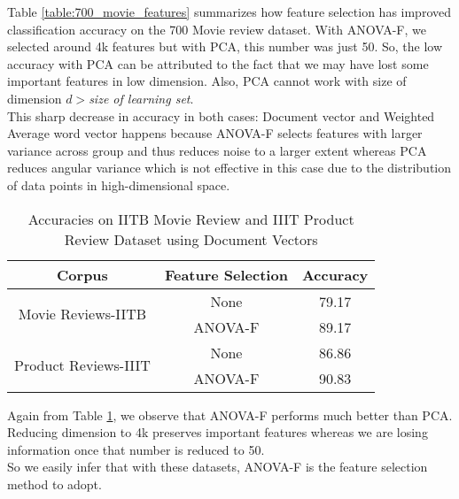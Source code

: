 Table \ref{table:700_movie_features} summarizes how feature selection has improved classification accuracy on the 700 Movie review dataset. With ANOVA-F, we selected around 4k features but with PCA, this number was just 50. So, the low accuracy with PCA can be attributed to the fact that we may have lost some important features in low dimension. Also, PCA cannot work with size of dimension $d>$\emph{size of learning set}.\\
This sharp decrease in accuracy in both cases: Document vector and Weighted Average word vector happens because ANOVA-F selects features with larger variance across group and thus reduces noise to a larger extent whereas PCA reduces angular variance which is not effective in this case due to the distribution of data points in high-dimensional space.

\begin{table}[h!]
\centering
\begin{tabular}{|c|c|c|}
\hline
\textbf{Corpus} & \textbf{Feature Selection} & \textbf{Accuracy} \\ \hline
\multirow{2}{*}{Movie Reviews-IITB}   & None    & 79.17 \\ \cline{2-3} 
                                      & ANOVA-F & 89.17 \\ \hline
\multirow{2}{*}{Product Reviews-IIIT} & None    & 86.86 \\ \cline{2-3} 
                                      & ANOVA-F & 90.83 \\ \hline
\end{tabular}
\caption {Accuracies on IITB Movie Review and IIIT Product Review Dataset using Document Vectors}
\label{table:review_features}
\end{table}
Again from Table \ref{table:review_features}, we observe that ANOVA-F performs much better than PCA. Reducing dimension to 4k preserves important features whereas we are losing information once that number is reduced to 50.\\
So we easily infer that with these datasets, ANOVA-F is the feature selection method to adopt.
